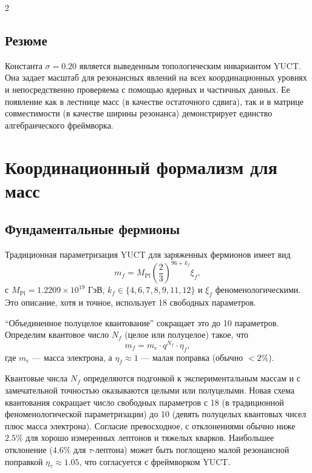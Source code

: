 \documentclass[11pt,a4paper]{article}
\begin{document}
\begin{multicols}{2}
		\subsection{Резюме}
		Константа $\sigma = 0.20$ является выведенным топологическим инвариантом YUCT. Она задает масштаб для резонансных явлений на всех координационных уровнях и непосредственно проверяема с помощью ядерных и частичных данных. Ее появление как в лестнице масс (в качестве остаточного сдвига), так и в матрице совместимости (в качестве ширины резонанса) демонстрирует единство алгебраического фреймворка.
		
		\section{Координационный формализм для масс}
		\label{sec:formalism}
		
		\subsection{Фундаментальные фермионы}
		
		Традиционная параметризация YUCT для заряженных фермионов имеет вид
		\begin{equation}
			m_f = M_{\mathrm{Pl}} \left( \frac{2}{3} \right)^{96 + k_f} \xi_f,
			\label{eq:mass_fermion}
		\end{equation}
		с \(M_{\mathrm{Pl}} = 1.2209\times 10^{19}\) ГэВ, \(k_f \in \{4,6,7,8,9,11,12\}\) и \(\xi_f\) феноменологическими. Это описание, хотя и точное, использует 18 свободных параметров.
		
		``Объединенное полуцелое квантование'' сокращает это до 10 параметров. Определим квантовое число \(N_f\) (целое или полуцелое) такое, что
		\begin{equation}
			m_f = m_e \cdot q^{N_f} \cdot \eta_f,
			\label{eq:mass_quantized}
		\end{equation}
		где \(m_e\) — масса электрона, а \(\eta_f \approx 1\) — малая поправка (обычно \(<2\%\)).
		
		Квантовые числа \(N_f\) определяются подгонкой к экспериментальным массам и с замечательной точностью оказываются целыми или полуцелыми.
		Новая схема квантования сокращает число свободных параметров с 18 (в традиционной феноменологической параметризации) до 10 (девять полуцелых квантовых чисел плюс масса электрона).
		Согласие превосходное, с отклонениями обычно ниже \(2.5\%\) для хорошо измеренных лептонов и тяжелых кварков.
		Наибольшее отклонение (\(4.6\%\) для \(\tau\)-лептона) может быть поглощено малой резонансной поправкой \(\eta_\tau \approx 1.05\), что согласуется с фреймворком YUCT.
		

\end{multicols}
\end{document}
